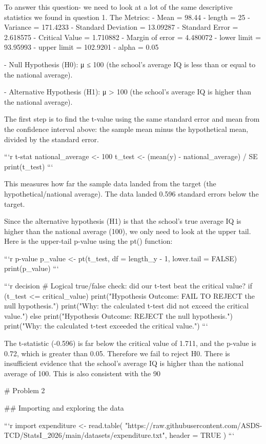 To answer this question- we need to look at a lot of the same descriptive statistics we found in question 1.
The Metrics: 
- Mean = 98.44 
- length = 25 
- Variance = 171.4233
- Standard Deviation = 13.09287 
- Standard Error = 2.618575
- Critical Value = 1.710882
- Margin of error = 4.480072
- lower limit = 93.95993
- upper limit = 102.9201
- alpha = 0.05

- Null Hypothesis (H0): μ ≤ 100 (the school’s average IQ is less than or equal to the national average).

- Alternative Hypothesis (H1): μ > 100 (the school’s average IQ is higher than the national average).

The first step is to find the t-value using the same standard error and mean from the confidence interval above: the sample mean minus the hypothetical mean, divided by the standard error.

```{r t-stat}
national_average <- 100
t_test <- (mean(y) - national_average) / SE
print(t_test)
```

This measures how far the sample data landed from the target (the hypothetical/national average). The data landed 0.596 standard errors below the target.

Since the alternative hypothesis (H1) is that the school’s true average IQ is higher than the national average (100), we only need to look at the upper tail. Here is the upper-tail p-value using the pt() function:

```{r p-value}
p_value <- pt(t_test, df = length_y - 1, lower.tail = FALSE)
print(p_value)
```

```{r decision}
# Logical true/false check: did our t-test beat the critical value?
if (t_test <= critical_value) {
  print("Hypothesis Outcome: FAIL TO REJECT the null hypothesis.")
  print("Why: the calculated t-test did not exceed the critical value.")
} else {
  print("Hypothesis Outcome: REJECT the null hypothesis.")
  print("Why: the calculated t-test exceeded the critical value.")
}
```

The t-statistic (-0.596) is far below the critical value of 1.711, and the p-value is 0.72, which is greater than 0.05. Therefore we fail to reject H0. There is insufficient evidence that the school’s average IQ is higher than the national average of 100. This is also consistent with the 90%

# Problem 2

## Importing and exploring the data

```{r import}
expenditure <- read.table(
  "https://raw.githubusercontent.com/ASDS-TCD/StatsI_2026/main/datasets/expenditure.txt",
  header = TRUE
)
```

